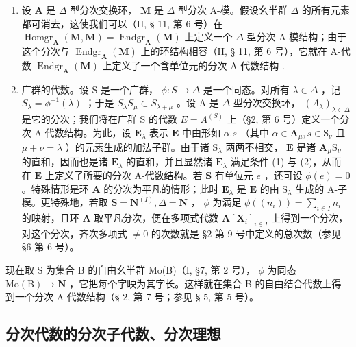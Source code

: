 \begin{enumerate}
\def\labelenumi{(\arabic{enumi})}
\setcounter{enumi}{1}
\item
  设 \(\mathbf{A}\) 是 \(\Delta\) 型分次交换环， \(\mathbf{M}\) 是 \(\Delta\) 型分次 A-模。假设幺半群 \(\Delta\) 的所有元素都可消去，这使我们可以（II, § 11, 第 6 号）在 \(\operatorname{Homgr}_{\mathbf{A}}(\mathbf{M}, \mathbf{M}) = \operatorname{Endgr}_{\mathbf{A}}(\mathbf{M})\) 上定义一个 \(\Delta\) 型分次 A-模结构；由于这个分次与 \(\operatorname{Endgr}_{\mathbf{A}}(\mathbf{M})\) 上的环结构相容（II, § 11, 第 6 号），它就在 A-代数 \(\operatorname{Endgr}_{\mathbf{A}}(\mathbf{M})\) 上定义了一个含单位元的分次 A-代数结构 .
\item
  广群的代数。设 S 是一个广群， \(\phi: S \to \Delta\) 是一个同态。对所有 \(\lambda \in \Delta\) ，记 \(S_{\lambda} = \phi^{-1}(\lambda)\) ；于是 \(S_{\lambda}S_{\mu} \subset S_{\lambda + \mu}\) 。设 A 是 \(\Delta\) 型分次交换环， \((A_{\lambda})_{\lambda \in \Delta}\) 是它的分次；我们将在广群 S 的代数 \(E = A^{(S)}\) 上（§2, 第 6 号）定义一个分次 A-代数结构。为此，设 \(\mathbf{E}_{\lambda}\) 表示 \(\mathbf{E}\) 中由形如 \(\alpha .s\) （其中 \(\alpha \in \mathbf{A}_{\mu}, s \in \mathrm{S}_{\nu}\) 且 \(\mu + \nu = \lambda\) ）的元素生成的加法子群。由于诸 \(\mathrm{S}_{\lambda}\) 两两不相交， \(\mathbf{E}\) 是诸 \(\mathbf{A}_{\mu}\mathrm{S}_{\nu}\) 的直和，因而也是诸 \(\mathbf{E}_{\lambda}\) 的直和，并且显然诸 \(\mathbf{E}_{\lambda}\) 满足条件 (1) 与 (2)，从而在 \(\mathbf{E}\) 上定义了所要的分次 A-代数结构。若 \(\mathbf{S}\) 有单位元 \(e\) ，还可设 \(\phi(e) = 0\) 。特殊情形是环 \(\mathbf{A}\) 的分次为平凡的情形；此时 \(\mathbf{E}_{\lambda}\) 是 \(\mathbf{E}\) 的由 \(\mathrm{S}_{\lambda}\) 生成的 A-子模。更特殊地，若取 \(\mathbf{S} = \mathbf{N}^{(I)}, \Delta = \mathbf{N}\) ， \(\phi\) 为满足 \(\phi((n_{i})) = \sum_{i \in I} n_{i}\) 的映射，且环 \(\mathbf{A}\) 取平凡分次，便在多项式代数 \(\mathbf{A}[\mathbf{X}_{i}]_{i \in I}\) 上得到一个分次，对这个分次，齐次多项式 \(\neq 0\) 的次数就是 §2 第 9 号中定义的总次数（参见 §6 第 6 号）。
\end{enumerate}

现在取 S 为集合 B 的自由幺半群 Mo(B)（I, §7, 第 2 号）， \(\phi\) 为同态 \(\mathrm{Mo(B)} \to \mathbf{N}\) ，它把每个字映为其字长。这样就在集合 B 的自由结合代数上得到一个分次 A-代数结构（§ 2, 第 7 号；参见 § 5, 第 5 号）。

\subsection{分次代数的分次子代数、分次理想}

